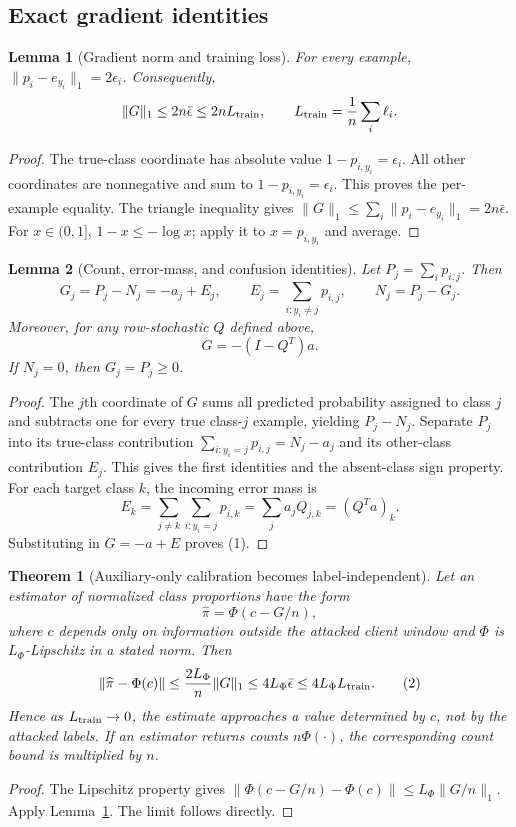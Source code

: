 \documentclass[11pt]{article}
\newtheorem{lemma}{Lemma}
\newtheorem{theorem}{Theorem}
\begin{document}
\subsection{Exact gradient identities}
\begin{lemma}[Gradient norm and training loss]
\label{lem:gradient-bound}
For every example, $\|p_i-e_{y_i}\|_1=2\epsilon_i$. Consequently,
\[
 \|G\|_1\le 2n\bar\epsilon\le 2nL_{\rm train},
 \qquad L_{\rm train}=\frac1n\sum_i\ell_i.
\]
\end{lemma}
\begin{proof}
The true-class coordinate has absolute value $1-p_{i,y_i}=\epsilon_i$.
All other coordinates are nonnegative and sum to $1-p_{i,y_i}=\epsilon_i$.
This proves the per-example equality. The triangle inequality gives
$\|G\|_1\le\sum_i\|p_i-e_{y_i}\|_1=2n\bar\epsilon$.
For $x\in(0,1]$, $1-x\le-\log x$; apply it to $x=p_{i,y_i}$ and average.
\end{proof}

\begin{lemma}[Count, error-mass, and confusion identities]
\label{lem:exact-identities}
Let $P_j=\sum_i p_{i,j}$. Then
\[
 G_j=P_j-N_j=-a_j+E_j,\qquad
 E_j=\sum_{i:y_i\ne j}p_{i,j},\qquad
 N_j=P_j-G_j.
\]
Moreover, for any row-stochastic $Q$ defined above,
\[
                     G=-(I-Q^T)a. \tag{1}
\]
If $N_j=0$, then $G_j=P_j\ge0$.
\end{lemma}
\begin{proof}
The $j$th coordinate of $G$ sums all predicted probability assigned to class
$j$ and subtracts one for every true class-$j$ example, yielding $P_j-N_j$.
Separate $P_j$ into its true-class contribution
$\sum_{i:y_i=j}p_{i,j}=N_j-a_j$ and its other-class contribution $E_j$.
This gives the first identities and the absent-class sign property. For each
target class $k$, the incoming error mass is
\[
 E_k=\sum_{j\ne k}\sum_{i:y_i=j}p_{i,k}
     =\sum_j a_jQ_{j,k}=(Q^Ta)_k.
\]
Substituting in $G=-a+E$ proves (1).
\end{proof}

\begin{theorem}[Auxiliary-only calibration becomes label-independent]
\label{thm:aux-collapse}
Let an estimator of normalized class proportions have the form
\[
 \widehat\pi=\Phi(c-G/n),
\]
where $c$ depends only on information outside the attacked client window and
$\Phi$ is $L_\Phi$-Lipschitz in a stated norm. Then
\[
 \|\widehat\pi-\Phi(c)\|
 \le \frac{2L_\Phi}{n}\|G\|_1
 \le 4L_\Phi\bar\epsilon
 \le 4L_\Phi L_{\rm train}. \tag{2}
\]
Hence as $L_{\rm train}\to0$, the estimate approaches a value determined by
$c$, not by the attacked labels. If an estimator returns counts $n\Phi(\cdot)$,
the corresponding count bound is multiplied by $n$.
\end{theorem}
\begin{proof}
The Lipschitz property gives
$\|\Phi(c-G/n)-\Phi(c)\|\le L_\Phi\|G/n\|_1$. Apply
Lemma~\ref{lem:gradient-bound}. The limit follows directly.
\end{proof}
\end{document}
